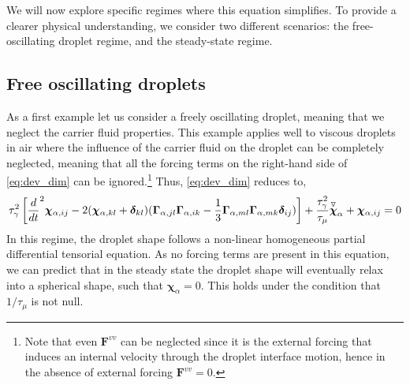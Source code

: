 We will now explore specific regimes where this equation simplifies. To provide a clearer physical understanding, we consider two different scenarios: 
the free-oscillating droplet regime,
and 
the steady-state regime. 


\subsection{Free oscillating droplets}

As a first example let us consider a freely oscillating droplet, meaning that we neglect the carrier fluid properties. 
This example applies well to viscous droplets in air where the influence of the carrier fluid on the droplet can be completely neglected, meaning that all the forcing terms on the right-hand side of \ref{eq:dev_dim} can be ignored.\footnote{
    Note that even $\textbf{F}^{vv}$ can be neglected since it is the external forcing that induces an internal velocity through the droplet interface motion, hence in the absence of external forcing  $\textbf{F}^{vv}=0$.  
} 
Thus, \ref{eq:dev_dim} reduces to, 
\begin{equation}
    \tau_\gamma^2
    \left[
        \frac{d}{dt}^2 \bm\chi_{\alpha,ij}
        -  2 (\bm\chi_{\alpha,kl} + \bm\delta_{kl})
        (\bm\Gamma_{\alpha,jl}\bm\Gamma_{\alpha,ik}  
        - \frac{1}{3}
        \bm\Gamma_{\alpha,ml}\bm\Gamma_{\alpha,mk}  
        \bm\delta_{ij}
        )
    \right]
    + \frac{\tau_\gamma^2}{\tau_\mu} \overset{ \triangledown  }{\bm\chi}_\alpha
    + \bm\chi_{\alpha,ij} = 0
\end{equation}
In this regime, the droplet shape follows a non-linear homogeneous partial differential tensorial equation. 
As no forcing terms are present in this equation, we can predict that in the steady state the droplet shape will eventually relax into a spherical shape, such that $\bm\chi_\alpha = 0$.
This holds under the condition that $1/\tau_\mu$ is not null.   


